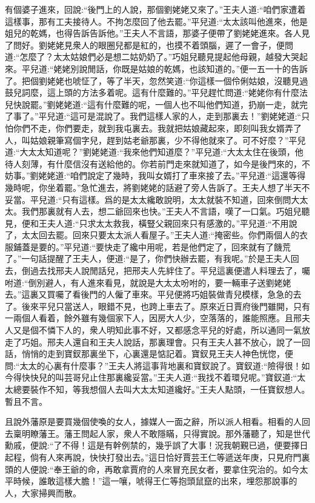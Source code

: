 \begin{parag}
    有個婆子進來，回說:“後門上的人說，那個劉姥姥又來了。”王夫人道:“咱們家遭着這樣事，那有工夫接待人。不拘怎麼回了他去罷。”平兒道:“太太該叫他進來，他是姐兒的乾媽，也得告訴告訴他。”王夫人不言語，那婆子便帶了劉姥姥進來。各人見了問好。劉姥姥見衆人的眼圈兒都是紅的，也摸不着頭腦，遲了一會子，便問道:“怎麼了？太太姑娘們必是想二姑奶奶了。”巧姐兒聽見提起他母親，越發大哭起來。平兒道:“姥姥別說閒話，你既是姑娘的乾媽，也該知道的。”便一五一十的告訴了。把個劉姥姥也唬怔了，等了半天，忽然笑道:“你這樣一個伶俐姑娘，沒聽見過鼓兒詞麼，這上頭的方法多着呢。這有什麼難的。”平兒趕忙問道:“姥姥你有什麼法兒快說罷。”劉姥姥道:“這有什麼難的呢，一個人也不叫他們知道，扔崩一走，就完了事了。”平兒道:“這可是混說了。我們這樣人家的人，走到那裏去！”劉姥姥道:“只怕你們不走，你們要走，就到我屯裏去。我就把姑娘藏起來，即刻叫我女婿弄了人，叫姑娘親筆寫個字兒，趕到姑老爺那裏，少不得他就來了。可不好麼？”平兒道:“大太太知道呢？”劉姥姥道:“我來他們知道麼？”平兒道:“大太太住在後頭，他待人刻薄，有什麼信沒有送給他的。你若前門走來就知道了，如今是後門來的，不妨事。”劉姥姥道:“咱們說定了幾時，我叫女婿打了車來接了去。”平兒道:“這還等得幾時呢，你坐着罷。”急忙進去，將劉姥姥的話避了旁人告訴了。王夫人想了半天不妥當。平兒道:“只有這樣。爲的是太太纔敢說明，太太就裝不知道，回來倒問大太太。我們那裏就有人去，想二爺回來也快。”王夫人不言語，嘆了一口氣。巧姐兒聽見，便和王夫人道:“只求太太救我，橫豎父親回來只有感激的。”平兒道:“不用說了，太太回去罷。回來只要太太派人看屋子。”王夫人道:“掩密些。你們兩個人的衣服鋪蓋是要的。”平兒道:“要快走了纔中用呢，若是他們定了，回來就有了饑荒了。”一句話提醒了王夫人，便道:“是了，你們快辦去罷，有我呢。”於是王夫人回去，倒過去找邢夫人說閒話兒，把邢夫人先絆住了。平兒這裏便遣人料理去了，囑咐道:“倒別避人，有人進來看見，就說是大太太吩咐的，要一輛車子送劉姥姥去。”這裏又買囑了看後門的人僱了車來。平兒便將巧姐裝做青兒模樣，急急的去了。後來平兒只當送人，眼錯不見，也跨上車去了。原來近日賈府後門雖開，只有一兩個人看着，餘外雖有幾個家下人，因房大人少，空落落的，誰能照應。且邢夫人又是個不憐下人的，衆人明知此事不好，又都感念平兒的好處，所以通同一氣放走了巧姐。邢夫人還自和王夫人說話，那裏理會。只有王夫人甚不放心，說了一回話，悄悄的走到寶釵那裏坐下，心裏還是惦記着。寶釵見王夫人神色恍惚，便問:“太太的心裏有什麼事？”王夫人將這事背地裏和寶釵說了。寶釵道:“險得很！如今得快快兒的叫芸哥兒止住那裏纔妥當。”王夫人道:“我找不着環兒呢。”寶釵道:“太太總要裝作不知，等我想個人去叫大太太知道纔好。”王夫人點頭，一任寶釵想人。暫且不言。
\end{parag}


\begin{parag}
    且說外藩原是要買幾個使喚的女人，據媒人一面之辭，所以派人相看。相看的人回去稟明瞭藩王。藩王問起人家，衆人不敢隱瞞，只得實說。那外藩聽了，知是世代勳戚，便說:“了不得！這是有幹例禁的，幾乎誤了大事！況我朝覲已過，便要擇日起程，倘有人來再說，快快打發出去。”這日恰好賈芸王仁等遞送年庚，只見府門裏頭的人便說:“奉王爺的命，再敢拿賈府的人來冒充民女者，要拿住究治的。如今太平時候，誰敢這樣大膽！”這一嚷，唬得王仁等抱頭鼠竄的出來，埋怨那說事的人，大家掃興而散。
\end{parag}


